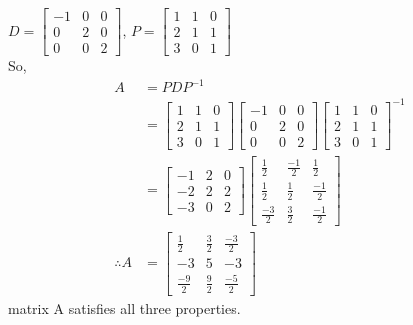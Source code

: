 \documentclass[solution,addpoints,12pt]{exam}
\newenvironment{Solution}{\begin{solution}}{\end{solution}}
\begin{document}
\begin{questions}
\begin{Solution}
        $D = \begin{bmatrix}
    -1 & 0 & 0\\
    0 & 2 & 0\\
    0 & 0 & 2
    \end{bmatrix}$, $P = \begin{bmatrix}
    1 & 1 & 0\\
    2 & 1 & 1\\
    3 & 0 & 1
    \end{bmatrix}$\\
    So,
        \begin{align*}
        A &= PDP^{-1}\\
        &= \begin{bmatrix}
    1 & 1 & 0\\
    2 & 1 & 1\\
    3 & 0 & 1
    \end{bmatrix}\begin{bmatrix}
    -1 & 0 & 0\\
    0 & 2 & 0\\
    0 & 0 & 2
    \end{bmatrix}\begin{bmatrix}
    1 & 1 & 0\\
    2 & 1 & 1\\
    3 & 0 & 1
    \end{bmatrix}^{-1}\\
    &= \begin{bmatrix}
    -1 & 2 & 0\\
    -2 & 2 &2\\
    -3 & 0 & 2
    \end{bmatrix}\begin{bmatrix}
    \frac{1}{2} & \frac{-1}{2} & \frac{1}{2}\\
    \frac{1}{2} & \frac{1}{2} & \frac{-1}{2}\\
    \frac{-3}{2} & \frac{3}{2} & \frac{-1}{2}
    \end{bmatrix}\\
    \therefore A&= \begin{bmatrix}
    \frac{1}{2} & \frac{3}{2} & \frac{-3}{2}\\
    -3 & 5 & -3\\
    \frac{-9}{2} & \frac{9}{2} & \frac{-5}{2}
    \end{bmatrix}
        \end{align*}
        matrix A satisfies all three properties. 
        \end{Solution}


\end{questions}
\end{document}
